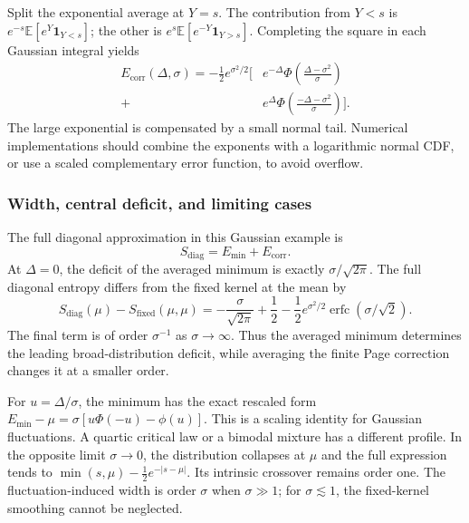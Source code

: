 \documentclass[11pt,letterpaper]{article}
\theoremstyle{plain}
\theoremstyle{definition}
\theoremstyle{remark}
\begin{document}
Split the exponential average at $Y=s$. The contribution from $Y<s$ is
$e^{-s}\mathbb E[e^Y\boldsymbol 1_{Y<s}]$; the other is
$e^s\mathbb E[e^{-Y}\boldsymbol 1_{Y>s}]$. Completing the square in each
Gaussian integral yields
\begin{align}
 E_{\mathrm{corr}}(\Delta,\sigma)
 =-\frac12e^{\sigma^2/2}\bigg[
 &e^{-\Delta}\Phi\!\left(\frac{\Delta-\sigma^2}{\sigma}\right)\nonumber\\
 +{}&e^{\Delta}\Phi\!\left(\frac{-\Delta-\sigma^2}{\sigma}\right)\bigg].
 \label{eq08:broadened_corr}
\end{align}
The large exponential is compensated by a small normal tail. Numerical
implementations should combine the exponents with a logarithmic normal CDF,
or use a scaled complementary error function, to avoid overflow.

\subsubsection{Width, central deficit, and limiting cases}
\label{subsec08:combined}

The full diagonal approximation in this Gaussian example is
\begin{equation}
 S_{\mathrm{diag}}=E_{\mathrm{min}}+E_{\mathrm{corr}}.
 \label{eq08:broadened_page_curve}
\end{equation}
At $\Delta=0$, the deficit of the averaged minimum is exactly
$\sigma/\sqrt{2\pi}$. The full diagonal entropy differs from the fixed kernel
at the mean by
\begin{equation}
 S_{\mathrm{diag}}(\mu)-S_{\mathrm{fixed}}(\mu,\mu)
 =-\frac{\sigma}{\sqrt{2\pi}}+\frac12
  -\frac12e^{\sigma^2/2}\operatorname{erfc}(\sigma/\sqrt2).
 \label{eq08:peak_deficit}
\end{equation}
The final term is of order $\sigma^{-1}$ as $\sigma\to\infty$. Thus the
averaged minimum determines the leading broad-distribution deficit, while
averaging the finite Page correction changes it at a smaller order.

For $u=\Delta/\sigma$, the minimum has the exact rescaled form
$E_{\mathrm{min}}-\mu=\sigma[u\Phi(-u)-\phi(u)]$. This is a scaling identity
for Gaussian fluctuations. A quartic critical law or a bimodal mixture has a
different profile. In the opposite limit $\sigma\to0$, the distribution
collapses at $\mu$ and the full expression tends to
$\min(s,\mu)-\tfrac12e^{-|s-\mu|}$. Its intrinsic crossover remains order one.
The fluctuation-induced width is order $\sigma$ when $\sigma\gg1$; for
$\sigma\lesssim1$, the fixed-kernel smoothing cannot be neglected.
\end{document}
